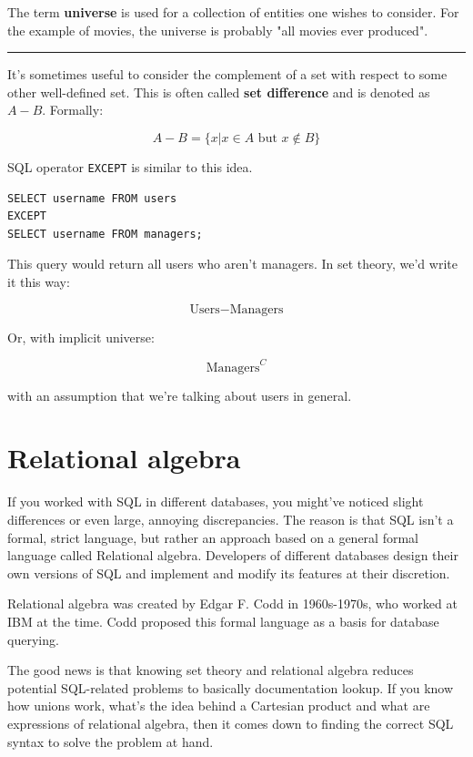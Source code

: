 \documentclass[a4paper, justified, notitlepage, sfsidenotes, notoc]{tufte-book}
\begin{document}
The term \textbf{universe} is used for a collection of entities one wishes to consider. For the example of movies, the universe is probably "all movies ever produced".

\noindent\rule{\textwidth}{0.5pt}

It's sometimes useful to consider the complement of a set with respect to some other well-defined set. This is often called \textbf{set difference} and is denoted as \(A - B\). Formally:

\begin{equation}
A - B = \{x | x \in A \textrm{ but } x \notin B\}
\end{equation}

SQL operator \texttt{EXCEPT} is similar to this idea.

\begin{verbatim}
SELECT username FROM users
EXCEPT
SELECT username FROM managers;
\end{verbatim}

This query would return all users who aren't managers. In set theory, we'd write it this way:

\begin{equation}
\textrm{Users} - \textrm{Managers}
\end{equation}

Or, with implicit universe:

\begin{equation}
\textrm{Managers}^{C}
\end{equation}

with an assumption that we're talking about users in general.

\section{Relational algebra}
\label{sec:org0a19f1b}

If you worked with SQL in different databases, you might've noticed slight differences or even large, annoying discrepancies. The reason is that SQL isn't a formal, strict language, but rather an approach based on a general formal language called Relational algebra. Developers of different databases design their own versions of SQL and implement and modify its features at their discretion.

Relational algebra was created by Edgar F. Codd in 1960s-1970s, who worked at IBM at the time. Codd proposed this formal language as a basis for database querying.

The good news is that knowing set theory and relational algebra reduces potential SQL-related problems to basically documentation lookup. If you know how unions work, what's the idea behind a Cartesian product and what are expressions of relational algebra, then it comes down to finding the correct SQL syntax to solve the problem at hand.
\end{document}
